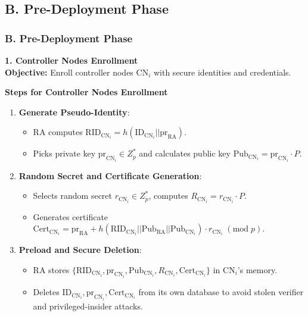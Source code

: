 \documentclass[9pt,handout]{beamer}
\begin{document}
\subsection{B. Pre-Deployment Phase}
\begin{frame}
    \frametitle{B. Pre-Deployment Phase}
    \textbf{1. Controller Nodes Enrollment\\}
    \textbf{Objective:} Enroll controller nodes \(\text{CN}_i\) with secure identities and credentials.

    \textbf{Steps for Controller Nodes Enrollment}
    \begin{enumerate}
        \item \textbf{Generate Pseudo-Identity}:
        \begin{itemize}
            \item RA computes \( \text{RID}_{\text{CN}_i} = h(\text{ID}_{\text{CN}_i} || \text{pr}_{\text{RA}}) \).
            \item Picks private key \( \text{pr}_{\text{CN}_i} \in Z^*_p \) and calculates public key \( \text{Pub}_{\text{CN}_i} = \text{pr}_{\text{CN}_i} \cdot P \).
        \end{itemize}
        \item \textbf{Random Secret and Certificate Generation}:
        \begin{itemize}
            \item Selects random secret \( r_{\text{CN}_i} \in Z^*_p \), computes \( R_{\text{CN}_i} = r_{\text{CN}_i} \cdot P \).
            \item Generates certificate \( \text{Cert}_{\text{CN}_i} = \text{pr}_{\text{RA}} + h(\text{RID}_{\text{CN}_i} || \text{Pub}_{\text{RA}} || \text{Pub}_{\text{CN}_i}) \cdot r_{\text{CN}_i} \;(\text{mod} \; p) \).
        \end{itemize}
        \item \textbf{Preload and Secure Deletion}:
        \begin{itemize}
            \item RA stores \( \{\text{RID}_{\text{CN}_i}, \text{pr}_{\text{CN}_i}, \text{Pub}_{\text{CN}_i}, R_{\text{CN}_i}, \text{Cert}_{\text{CN}_i}\} \) in \( \text{CN}_i \)'s memory.
            \item Deletes \( \text{ID}_{\text{CN}_i}, \text{pr}_{\text{CN}_i}, \text{Cert}_{\text{CN}_i} \) from its own database to avoid stolen verifier and privileged-insider attacks.
        \end{itemize}
    \end{enumerate}
\end{frame}
\end{document}
